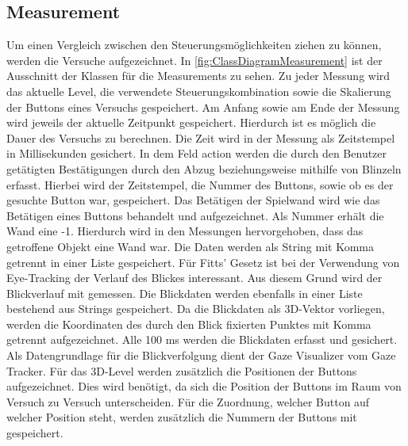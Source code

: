 \subsection{Measurement}
\label{section:measurement}
Um einen Vergleich zwischen den Steuerungsmöglichkeiten ziehen zu können, werden die Versuche aufgezeichnet. In \autoref{fig:ClassDiagramMeasurement} ist der Ausschnitt der Klassen für die Measurements zu sehen. Zu jeder Messung wird das aktuelle Level, die verwendete Steuerungskombination sowie die Skalierung der Buttons eines Versuchs gespeichert. Am Anfang sowie am Ende der Messung wird jeweils der aktuelle Zeitpunkt gespeichert. Hierdurch ist es möglich die Dauer des Versuchs zu berechnen. Die Zeit wird in der Messung als Zeitstempel in Millisekunden gesichert. In dem Feld action werden die durch den Benutzer getätigten Bestätigungen durch den Abzug beziehungsweise mithilfe von Blinzeln erfasst. Hierbei wird der Zeitstempel, die Nummer des Buttons, sowie ob es der gesuchte Button war, gespeichert. Das Betätigen der Spielwand  wird wie das Betätigen eines Buttons behandelt und aufgezeichnet. Als Nummer erhält die Wand eine -1. Hierdurch wird in den Messungen hervorgehoben, dass das getroffene Objekt eine Wand war.  Die Daten werden als String mit Komma getrennt in einer Liste gespeichert. Für Fitts' Gesetz ist bei der Verwendung von Eye-Tracking der Verlauf des Blickes interessant. Aus diesem Grund wird der Blickverlauf mit gemessen. Die Blickdaten werden ebenfalls in einer Liste bestehend aus Strings gespeichert. Da die Blickdaten als 3D-Vektor vorliegen, werden die Koordinaten des durch den Blick fixierten Punktes mit Komma getrennt aufgezeichnet. Alle 100 ms  werden die Blickdaten erfasst und gesichert. Als Datengrundlage für die Blickverfolgung dient der Gaze Visualizer vom Gaze Tracker. Für das 3D-Level werden zusätzlich die Positionen der Buttons aufgezeichnet. Dies wird benötigt, da sich die Position der Buttons im Raum von Versuch zu Versuch unterscheiden. Für die Zuordnung, welcher Button auf welcher Position steht, werden zusätzlich die Nummern der Buttons mit gespeichert.

